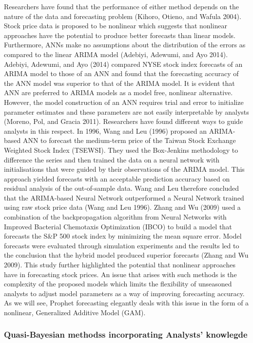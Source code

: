 \documentclass[12pt,a4paper]{article}
\numberwithin{equation}{section}
\numberwithin{figure}{section}
\numberwithin{table}{section}
\begin{document}
Researchers have found that the performance of either method depends on
the nature of the data and forecasting problem (Kihoro, Otieno, and
Wafula 2004). Stock price data is proposed to be nonlinear which
suggests that nonlinear approaches have the potential to produce better
forecasts than linear models. Furthermore, ANNs make no assumptions
about the distribution of the errors as compared to the linear ARIMA
model (Adebiyi, Adewumi, and Ayo 2014). Adebiyi, Adewumi, and Ayo (2014)
compared NYSE stock index forecasts of an ARIMA model to those of an ANN
and found that the forecasting accuracy of the ANN model was superior to
that of the ARIMA model. It is evident that ANN are preferred to ARIMA
models as a model free, nonlinear alternative. However, the model
construction of an ANN requires trial and error to initialize parameter
estimates and these parameters are not easily interpretable by analysts
(Moreno, Pol, and Gracia 2011). Researchers have found different ways to
guide analysts in this respect. In 1996, Wang and Leu (1996) proposed an
ARIMA-based ANN to forecast the medium-term price of the Taiwan Stock
Exchange Weighted Stock Index (TSEWSI). They used the Box-Jenkins
methodology to difference the series and then trained the data on a
neural network with initialisations that were guided by their
observations of the ARIMA model. This approach yielded forecasts with an
acceptable prediction accuracy based on residual analysis of the
out-of-sample data. Wang and Leu therefore concluded that the
ARIMA-based Neural Network outperformed a Neural Network trained using
raw stock price data (Wang and Leu 1996). Zhang and Wu (2009) used a
combination of the backpropagation algorithm from Neural Networks with
Improved Bacterial Chemotaxis Optimization (IBCO) to build a model that
forecasts the S\&P 500 stock index by minimizing the mean square error.
Model forecasts were evaluated through simulation experiments and the
results led to the conclusion that the hybrid model produced superior
forecasts (Zhang and Wu 2009). This study further highlighted the
potential that nonlinear approaches have in forecasting stock prices. An
issue that arises with such methods is the complexity of the proposed
models which limits the flexibility of unseasoned analysts to adjust
model parameters as a way of improving forecasting accuracy. As we will
see, Prophet forecasting elegantly deals with this issue in the form of
a nonlinear, Generalized Additive Model (GAM).

\subsubsection{Quasi-Bayesian methodss incorporating Analysts'
knowlegde}\label{quasi-bayesian-methodss-incorporating-analysts-knowlegde}
\end{document}
